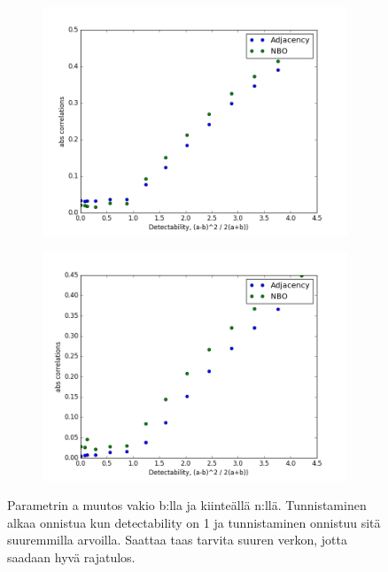 \documentclass[finnish,12pt,a4paper,pdftex,sci,utf8]{aaltothesis}
\begin{document}
\begin{figure}
	\centering
	\begin{subfigure}[b]{0.45 \textwidth}
		\includegraphics[width = \textwidth]{detectability_a_1.png}
	\end{subfigure}
	\begin{subfigure}[b]{0.45 \textwidth}
		\includegraphics[width = \textwidth]{detectability_a_2.png}
	\end{subfigure}
	\caption{Parametrin a muutos vakio b:lla ja kiinteällä n:llä. Tunnistaminen alkaa onnistua kun detectability on 1 ja tunnistaminen onnistuu sitä suuremmilla arvoilla. Saattaa taas tarvita suuren verkon, jotta saadaan hyvä rajatulos.}
	\label{fig:a_param}
\end{figure}
\end{document}
